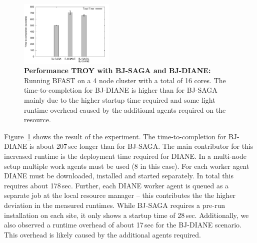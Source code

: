 \documentclass[conference,final]{IEEEtran}
\newcommand{\upp}{\vspace*{-0.5em}}
\begin{document}

\begin{figure}[t]
	\centering
		\includegraphics[width=0.4\textwidth]{perf/perf-bfast-bj.pdf}
	\caption{\textbf{Performance TROY with BJ-SAGA and BJ-DIANE:} Running BFAST 
	on a 4 node cluster with a total of 16 cores. The time-to-completion for 
	BJ-DIANE is higher than for BJ-SAGA mainly due to the higher startup 
	time required and some light runtime overhead caused by the additional 
	agents required on the resource.\upp \upp}
	\label{fig:perf_perf-bfast-bj}
\end{figure}



Figure~\ref{fig:perf_perf-bfast-bj} shows the result of the
experiment. The time-to-completion for BJ-DIANE is about 207\,sec
longer than for BJ-SAGA. The main contributor for this increased
runtime is the deployment time required for DIANE. In a multi-node
setup multiple work agents must be used (8 in this case).  For each
worker agent DIANE must be downloaded, installed and started
separately. In total this requires about 178\,sec. Further, each DIANE
worker agent is queued as a separate job at the local resource manager
-- this contributes the the higher deviation in the measured
runtimes. While BJ-SAGA requires a pre-run installation on each site,
it only shows a startup time of 28\,sec. Additionally, we also
observed a runtime overhead of about 17\,sec for the BJ-DIANE
scenario. This overhead is likely caused by the additional agents
required.

\end{document}
